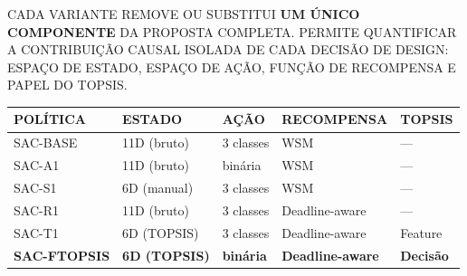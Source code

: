 \documentclass{beamer}
\begin{document}
{
\begin{frame}[plain, t]
\color{black}

\vspace{0.35cm}
\hspace{0.3cm}{\Large\bfseries\ttfamily ESTUDO DE ABLAÇÃO: DESIGN EXPERIMENTAL}

\vspace{0.20cm}
\hspace{0.3cm}
\begin{minipage}{0.92\textwidth}
{\scriptsize\ttfamily\setlength{\baselineskip}{1.5\baselineskip}
CADA VARIANTE REMOVE OU SUBSTITUI \textbf{UM ÚNICO COMPONENTE} DA
PROPOSTA COMPLETA. PERMITE QUANTIFICAR A CONTRIBUIÇÃO CAUSAL ISOLADA
DE CADA DECISÃO DE DESIGN: ESPAÇO DE ESTADO, ESPAÇO DE AÇÃO,
FUNÇÃO DE RECOMPENSA E PAPEL DO TOPSIS.
}
\end{minipage}

\vspace{0.25cm}
\hspace{0.3cm}
{\scriptsize\ttfamily
\begin{tabular}{lllll}
\hline
\textbf{POLÍTICA} & \textbf{ESTADO} & \textbf{AÇÃO} & \textbf{RECOMPENSA} & \textbf{TOPSIS} \\
\hline
SAC-BASE   & 11D (bruto)   & 3 classes & WSM            & ---      \\
SAC-A1     & 11D (bruto)   & binária   & WSM            & ---      \\
SAC-S1     & 6D (manual)   & 3 classes & WSM            & ---      \\
SAC-R1     & 11D (bruto)   & 3 classes & Deadline-aware & ---      \\
SAC-T1     & 6D (TOPSIS)   & 3 classes & Deadline-aware & Feature  \\
\textbf{SAC-FTOPSIS} & \textbf{6D (TOPSIS)} & \textbf{binária} & \textbf{Deadline-aware} & \textbf{Decisão} \\
\hline
\end{tabular}}


\end{frame}}
\end{document}
